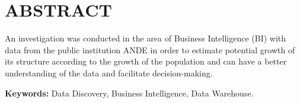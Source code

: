 \chapter*{\centering ABSTRACT}
	An investigation was conducted in the area of Business Intelligence (BI) with data from the public institution ANDE in order to estimate potential growth of its structure according to the growth of the population and can have a better understanding of the data and facilitate decision-making.


\vspace*{1\baselineskip}
\textbf{Keywords:} Data Discovery, Business Intelligence, Data Warehouse.